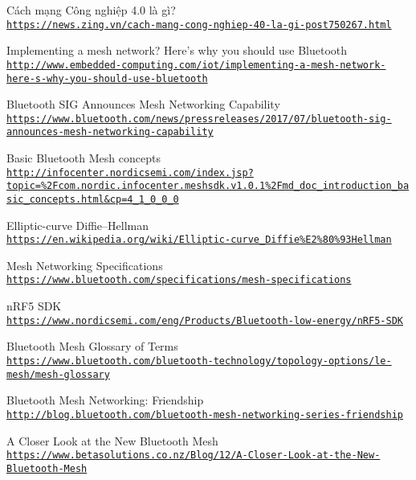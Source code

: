 \cleardoublepage
\renewcommand{\bibname}{Tài liệu tham khảo}
\begin{thebibliography}{80}

Cách mạng Công nghiệp 4.0 là gì?
\\\texttt{\url{https://news.zing.vn/cach-mang-cong-nghiep-40-la-gi-post750267.html}}

Implementing a mesh network? Here’s why you should use Bluetooth
\\\texttt{\url{http://www.embedded-computing.com/iot/implementing-a-mesh-network-here-s-why-you-should-use-bluetooth}}

Bluetooth SIG Announces Mesh Networking Capability
\\\texttt{\url{https://www.bluetooth.com/news/pressreleases/2017/07/bluetooth-sig-announces-mesh-networking-capability}}

Basic Bluetooth Mesh concepts
\\\texttt{\url{http://infocenter.nordicsemi.com/index.jsp?topic=\%2Fcom.nordic.infocenter.meshsdk.v1.0.1\%2Fmd\_doc\_introduction\_basic\_concepts.html\&cp=4\_1\_0\_0\_0}}

Elliptic-curve Diffie–Hellman
\\\texttt{\url{https://en.wikipedia.org/wiki/Elliptic-curve\_Diffie\%E2\%80\%93Hellman}}

Mesh Networking Specifications
\\\texttt{\url{https://www.bluetooth.com/specifications/mesh-specifications}}

nRF5 SDK
\\\texttt{\url{https://www.nordicsemi.com/eng/Products/Bluetooth-low-energy/nRF5-SDK}}


Bluetooth Mesh Glossary of Terms
\\\texttt{\url{https://www.bluetooth.com/bluetooth-technology/topology-options/le-mesh/mesh-glossary}}

Bluetooth Mesh Networking: Friendship
\\\texttt{\url{http://blog.bluetooth.com/bluetooth-mesh-networking-series-friendship}}

A Closer Look at the New Bluetooth Mesh
\\\texttt{\url{https://www.betasolutions.co.nz/Blog/12/A-Closer-Look-at-the-New-Bluetooth-Mesh}}


\end{thebibliography}
